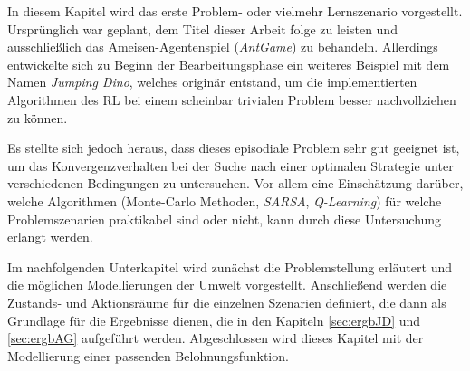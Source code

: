 In diesem Kapitel wird das erste Problem- oder vielmehr Lernszenario vorgestellt. Ursprünglich war geplant, dem Titel dieser Arbeit folge zu leisten und ausschließlich das Ameisen-Agentenspiel (\glqq \textit{AntGame}\grqq{}) zu behandeln. Allerdings entwickelte sich zu Beginn der Bearbeitungsphase ein weiteres Beispiel mit dem Namen \glqq \textit{Jumping Dino}\grqq{}, welches originär entstand, um die implementierten Algorithmen des RL bei einem scheinbar trivialen Problem besser nachvollziehen zu können.
\par 
Es stellte sich jedoch heraus, dass dieses episodiale Problem sehr gut geeignet ist, um das Konvergenzverhalten bei der Suche nach einer optimalen Strategie unter verschiedenen Bedingungen zu untersuchen. Vor allem eine Einschätzung darüber, welche Algorithmen (Monte-Carlo Methoden, \textit{SARSA}, \textit{Q-Learning}) für welche Problemszenarien praktikabel sind oder nicht, kann durch diese Untersuchung erlangt werden. 
\par 
Im nachfolgenden Unterkapitel wird zunächst die Problemstellung erläutert und die möglichen Modellierungen der Umwelt vorgestellt. Anschließend werden die Zustands- und Aktionsräume für die einzelnen Szenarien definiert, die dann als Grundlage für die Ergebnisse dienen, die in den Kapiteln \ref{sec:ergbJD} und \ref{sec:ergbAG} aufgeführt werden. Abgeschlossen wird dieses Kapitel mit der Modellierung einer passenden Belohnungsfunktion.

